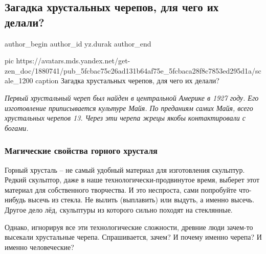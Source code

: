  
 
 
 
 
 
\subsection{Загадка хрустальных черепов, для чего их делали?}
\label{sec:06_12_2020.sites.ru.zen_yandex.yz.durak.1.zagadka_hrustalnyh_cherepov}
\ifcmt
	author_begin
   author_id yz.durak
	author_end
\fi

\ifcmt
  pic https://avatars.mds.yandex.net/get-zen_doc/1880741/pub_5fcbac75c26ad131b64af75e_5fcbaca28f8c7853ed295d1a/scale_1200
  caption Загадка хрустальных черепов, для чего их делали?
\fi

\begin{leftbar}
	\begingroup
		\em Первый хрустальный череп был найден в центральной Америке в 1927 году.
				Его изготовление приписывается культуре Майя. По преданиям самих Майя,
				всего хрустальных черепов 13. Через эти черепа жрецы якобы
				контактировали с богами.
	\endgroup
\end{leftbar}

\subsubsection{Магические свойства горного хрусталя}

Горный хрусталь – не самый удобный материал для изготовления скульптур. Редкий
скульптор, даже в наше технологически-продвинутое время, выберет этот материал
для собственного творчества. И это неспроста, сами попробуйте что-нибудь высечь
из стекла. Не вылить (выплавить) или выдуть, а именно высечь. Другое дело лёд,
скульптуры из которого сильно походят на стеклянные.

Однако, игнорируя все эти технологические сложности, древние люди зачем-то
высекали хрустальные черепа. Спрашивается, зачем? И почему именно черепа? И
именно человеческие?

